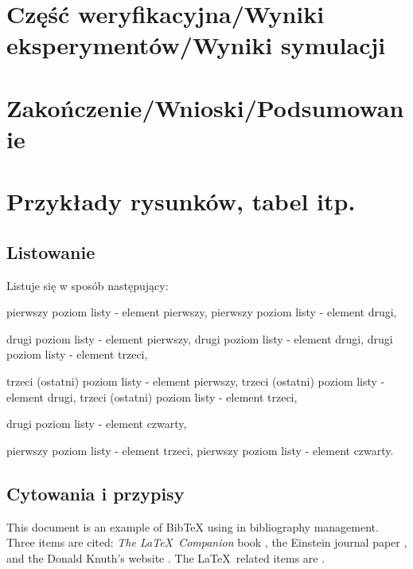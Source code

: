 \newpage
\section[Część weryfikacyjna]{Część weryfikacyjna/Wyniki eksperymentów/Wyniki symulacji}


\section[Zakończenie]{Zakończenie/Wnioski/Podsumowanie}


\newpage
\section[Przykłady]{Przykłady rysunków, tabel itp.}
\subsection{Listowanie}
Listuje się w sposób następujący:
\begin{itemize}
	\itemi pierwszy poziom listy - element pierwszy,
	\itemi pierwszy poziom listy - element drugi,
	\begin{itemize}
		\itemii drugi poziom listy - element pierwszy,
		\itemii drugi poziom listy - element drugi,
		\itemii drugi poziom listy - element trzeci,
		\begin{itemize}
			\itemiii trzeci (ostatni) poziom listy - element pierwszy,
			\itemiii trzeci (ostatni) poziom listy - element drugi,
			\itemiii trzeci (ostatni) poziom listy - element trzeci,
		\end{itemize}
		\itemii drugi poziom listy - element czwarty,
		\end{itemize}
	\itemi pierwszy poziom listy - element trzeci,
	\itemi pierwszy poziom listy - element czwarty.
\end{itemize}

\subsection{Cytowania i przypisy}
This document is an example of BibTeX using in bibliography management. Three items 
are cited: \textit{The \LaTeX\ Companion} book \cite{latexcompanion}, the Einstein
journal paper \cite{einstein}, and the Donald Knuth's website \cite{knuthwebsite}. 
The \LaTeX\ related items are \cite{latexcompanion,knuthwebsite}.\footnotemark[1]



\newpage



